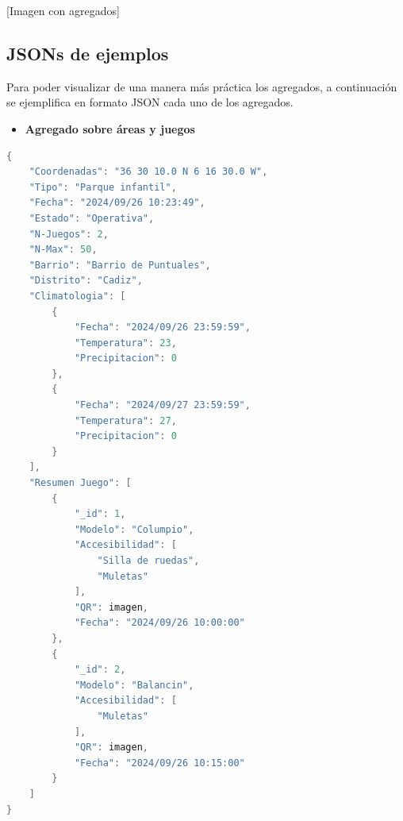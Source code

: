 \documentclass[]{article}
\begin{document}
[Imagen con agregados]

\subsection{JSONs de ejemplos}
\label{sub_sec:json_ejemplos}
Para poder visualizar de una manera más práctica los agregados, a continuación se ejemplifica en formato JSON cada uno de los agregados. 
\begin{itemize}
    \item \textbf{Agregado sobre áreas y juegos}
\end{itemize}
\begin{lstlisting}[caption=Ejemplo de JSON para Agregado sobre Áreas y Juegos, language=C]
{
    "Coordenadas": "36 30 10.0 N 6 16 30.0 W",
    "Tipo": "Parque infantil",
    "Fecha": "2024/09/26 10:23:49",
    "Estado": "Operativa",
    "N-Juegos": 2,
    "N-Max": 50,
    "Barrio": "Barrio de Puntuales",
    "Distrito": "Cadiz",
    "Climatologia": [
        {
            "Fecha": "2024/09/26 23:59:59",
            "Temperatura": 23,
            "Precipitacion": 0
        },
        {
            "Fecha": "2024/09/27 23:59:59",
            "Temperatura": 27,
            "Precipitacion": 0
        }
    ],
    "Resumen Juego": [
        {
            "_id": 1,
            "Modelo": "Columpio",
            "Accesibilidad": [
                "Silla de ruedas",
                "Muletas"
            ],
            "QR": imagen,
            "Fecha": "2024/09/26 10:00:00"
        },
        {
            "_id": 2,
            "Modelo": "Balancin",
            "Accesibilidad": [
                "Muletas"
            ],
            "QR": imagen,
            "Fecha": "2024/09/26 10:15:00"
        }
    ]
}
\end{lstlisting}
\end{document}
